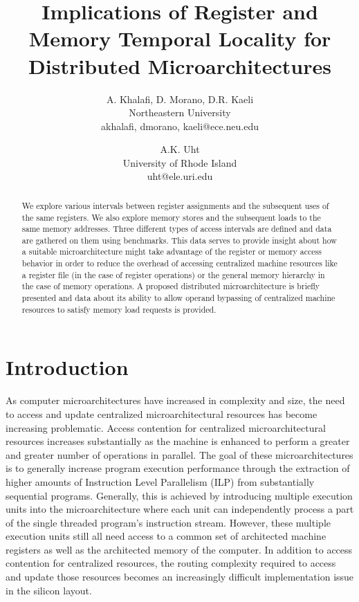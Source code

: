 \documentclass[10pt,dvips]{article}
\begin{document}
%
%
%
\title{Implications of Register and Memory Temporal Locality for
Distributed Microarchitectures}
%
%
\author{
A. Khalafi, D. Morano, D.R. Kaeli\\
Northeastern University\\
{akhalafi, dmorano, kaeli}@ece.neu.edu\\
\and
A.K. Uht\\
University of Rhode Island\\ 
uht@ele.uri.edu
}
%
%
\date{}
%
\maketitle
%
%
%
\begin{abstract}
%
We explore various intervals between register
assignments and the subsequent uses of the same registers.
We also explore memory stores and the
subsequent loads to the same memory addresses.
Three different types of access intervals
are defined and data are gathered on them using benchmarks.
This data serves to provide insight
about how a suitable microarchitecture might take advantage
of the register or memory access behavior in order to reduce the overhead
of accessing centralized machine resources like
a register file (in the case of register operations)
or the general memory hierarchy in the case of memory
operations.
A proposed distributed microarchitecture is briefly presented
and data about its ability to allow operand bypassing
of centralized machine resources
to satisfy memory load requests is provided.
%
\end{abstract}
%
%
\section{Introduction}
%
As computer microarchitectures have increased in complexity and
size, the need to access and update centralized microarchitectural
resources has become increasing problematic.
Access contention for centralized microarchitectural resources
increases substantially as the machine is enhanced to perform
a greater and greater number of operations in parallel.
The goal of these microarchitectures is to generally increase
program execution performance through the extraction of higher
amounts of Instruction Level Parallelism (ILP) from substantially
sequential programs.
Generally, this is achieved by introducing multiple
execution units into the microarchitecture where each unit
can independently process a part of the single threaded program's
instruction stream.  
However, these multiple execution units
still all need access to a common set of architected machine registers
as well as the architected memory of the computer.
In addition to access contention for centralized resources,
the routing complexity required to access and update those
resources becomes an increasingly difficult implementation issue
in the silicon layout.
\end{document}
